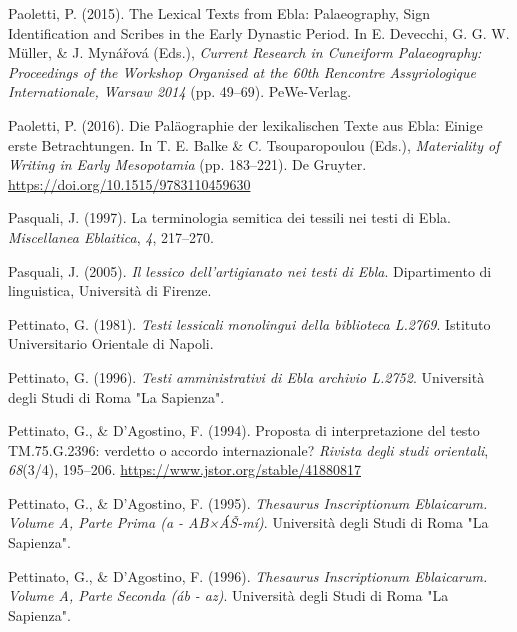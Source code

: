 \documentclass[
]{book}
\newlength{\cslhangindent}
\newlength{\cslentryspacingunit} %
\newenvironment{CSLReferences}[2] %
 {%
  \setlength{\parindent}{0pt}
  \ifodd #1
  \let\oldpar\par
  \def\par{\hangindent=\cslhangindent\oldpar}
  \fi
  \setlength{\parskip}{#2\cslentryspacingunit}
 }%
 {}
\begin{document}
\begin{CSLReferences}{1}{0}
\leavevmode{}%
Paoletti, P. (2015). The {Lexical Texts} from {Ebla}: {Palaeography}, {Sign Identification} and {Scribes} in the {Early Dynastic Period}. In E. Devecchi, G. G. W. Müller, \& J. Mynářová (Eds.), \emph{Current {Research} in {Cuneiform Palaeography}: {Proceedings} of the {Workshop Organised} at the 60th {Rencontre Assyriologique Internationale}, {Warsaw} 2014} (pp. 49--69). PeWe-Verlag.

\leavevmode{}%
Paoletti, P. (2016). Die Paläographie der lexikalischen Texte aus Ebla: Einige erste Betrachtungen. In T. E. Balke \& C. Tsouparopoulou (Eds.), \emph{Materiality of Writing in Early Mesopotamia} (pp. 183--221). De Gruyter. \url{https://doi.org/10.1515/9783110459630}

\leavevmode{}%
Pasquali, J. (1997). La terminologia semitica dei tessili nei testi di Ebla. \emph{Miscellanea Eblaitica}, \emph{4}, 217--270.

\leavevmode{}%
Pasquali, J. (2005). \emph{Il lessico dell'artigianato nei testi di Ebla}. Dipartimento di linguistica, Università di Firenze.

\leavevmode{}%
Pettinato, G. (1981). \emph{Testi lessicali monolingui della biblioteca L.2769}. Istituto Universitario Orientale di Napoli.

\leavevmode{}%
Pettinato, G. (1996). \emph{Testi amministrativi di Ebla archivio L.2752}. Università degli Studi di Roma "La Sapienza".

\leavevmode{}%
Pettinato, G., \& D'Agostino, F. (1994). Proposta di interpretazione del testo TM.75.G.2396: verdetto o accordo internazionale? \emph{Rivista degli studi orientali}, \emph{68}(3/4), 195--206. \url{https://www.jstor.org/stable/41880817}

\leavevmode{}%
Pettinato, G., \& D'Agostino, F. (1995). \emph{Thesaurus Inscriptionum Eblaicarum. Volume A, Parte Prima (a - AB×ÁŠ-mí)}. Università degli Studi di Roma "La Sapienza".

\leavevmode{}%
Pettinato, G., \& D'Agostino, F. (1996). \emph{Thesaurus Inscriptionum Eblaicarum. Volume A, Parte Seconda (áb - az)}. Università degli Studi di Roma "La Sapienza".


\end{CSLReferences}
\end{document}
